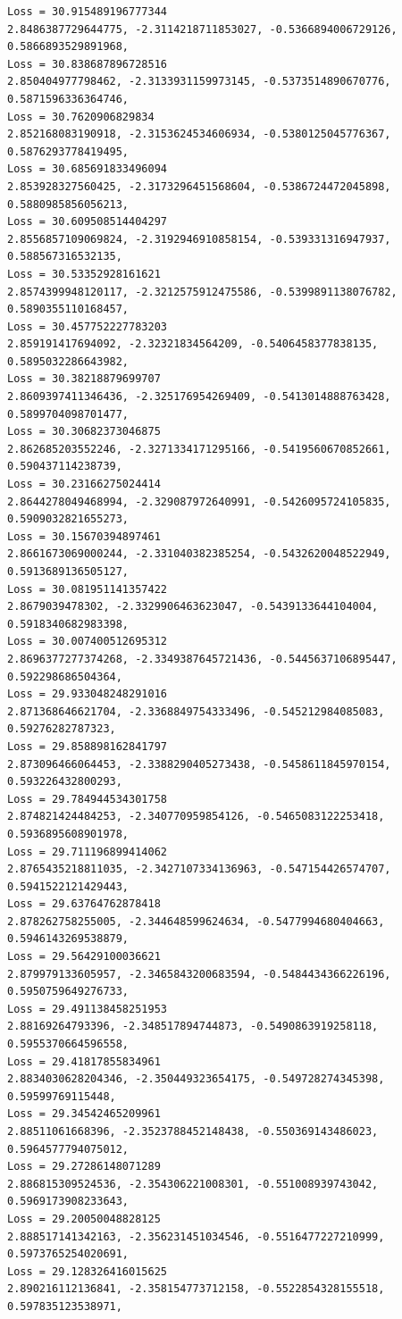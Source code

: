 \documentclass[11pt]{article}
\begin{document}
\begin{Verbatim}[commandchars=\\\{\}]
Loss = 30.915489196777344
2.8486387729644775, -2.3114218711853027, -0.5366894006729126,
0.5866893529891968,
Loss = 30.838687896728516
2.850404977798462, -2.3133931159973145, -0.5373514890670776, 0.5871596336364746,
Loss = 30.7620906829834
2.852168083190918, -2.3153624534606934, -0.5380125045776367, 0.5876293778419495,
Loss = 30.685691833496094
2.853928327560425, -2.3173296451568604, -0.5386724472045898, 0.5880985856056213,
Loss = 30.609508514404297
2.8556857109069824, -2.3192946910858154, -0.539331316947937, 0.588567316532135,
Loss = 30.53352928161621
2.8574399948120117, -2.3212575912475586, -0.5399891138076782,
0.5890355110168457,
Loss = 30.457752227783203
2.859191417694092, -2.32321834564209, -0.5406458377838135, 0.5895032286643982,
Loss = 30.38218879699707
2.8609397411346436, -2.325176954269409, -0.5413014888763428, 0.5899704098701477,
Loss = 30.30682373046875
2.862685203552246, -2.3271334171295166, -0.5419560670852661, 0.590437114238739,
Loss = 30.23166275024414
2.8644278049468994, -2.329087972640991, -0.5426095724105835, 0.5909032821655273,
Loss = 30.15670394897461
2.8661673069000244, -2.331040382385254, -0.5432620048522949, 0.5913689136505127,
Loss = 30.081951141357422
2.8679039478302, -2.3329906463623047, -0.5439133644104004, 0.5918340682983398,
Loss = 30.007400512695312
2.8696377277374268, -2.3349387645721436, -0.5445637106895447, 0.592298686504364,
Loss = 29.933048248291016
2.871368646621704, -2.3368849754333496, -0.545212984085083, 0.59276282787323,
Loss = 29.858898162841797
2.873096466064453, -2.3388290405273438, -0.5458611845970154, 0.593226432800293,
Loss = 29.784944534301758
2.874821424484253, -2.340770959854126, -0.5465083122253418, 0.5936895608901978,
Loss = 29.711196899414062
2.8765435218811035, -2.3427107334136963, -0.547154426574707, 0.5941522121429443,
Loss = 29.63764762878418
2.878262758255005, -2.344648599624634, -0.5477994680404663, 0.5946143269538879,
Loss = 29.56429100036621
2.879979133605957, -2.3465843200683594, -0.5484434366226196, 0.5950759649276733,
Loss = 29.491138458251953
2.88169264793396, -2.348517894744873, -0.5490863919258118, 0.5955370664596558,
Loss = 29.41817855834961
2.8834030628204346, -2.350449323654175, -0.549728274345398, 0.59599769115448,
Loss = 29.34542465209961
2.88511061668396, -2.3523788452148438, -0.550369143486023, 0.5964577794075012,
Loss = 29.27286148071289
2.886815309524536, -2.354306221008301, -0.551008939743042, 0.5969173908233643,
Loss = 29.20050048828125
2.888517141342163, -2.356231451034546, -0.5516477227210999, 0.5973765254020691,
Loss = 29.128326416015625
2.890216112136841, -2.358154773712158, -0.5522854328155518, 0.597835123538971,

\end{Verbatim}
\end{document}
